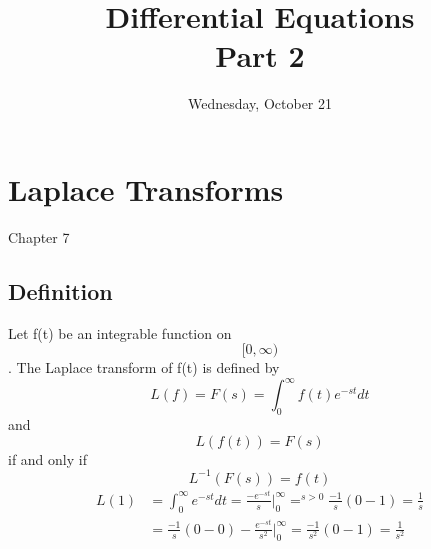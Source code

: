 \documentclass[10pt,a4paper]{article}
\begin{document}
\title{Differential Equations\\Part 2}
\date{}
\maketitle
\pagebreak
\date{Wednesday, October 21}
\section{Laplace Transforms}
Chapter 7
\subsection{Definition}
Let f(t) be an integrable function on\begin{equation} [0,\infty)\end{equation}. The Laplace transform of f(t) is defined by
\begin{equation}
L(f)=F(s)=\int_{0}^{\infty}f(t)e^{-st}dt
\end{equation}
and
\begin{equation}
L(f(t))=F(s)
\end{equation}
if and only if 
\begin{equation}
L^{-1}(F(s))=f(t)
\end{equation}
\begin{align}
L(1)&=\int _{0} ^{\infty} e^{-st}dt=\frac{-e^{-st}}{s}|_{0}^{\infty} =^{s>0} \frac{-1}{s}(0-1)=\frac{1}{s}\\
&=\frac{-1}{s}(0-0)-\frac{e^{-st}}{s^{2}}|_{0}^{\infty}=\frac{-1}{s^{2}}(0-1)=\frac{1}{s^{2}}
\end{align}
\end{document}
